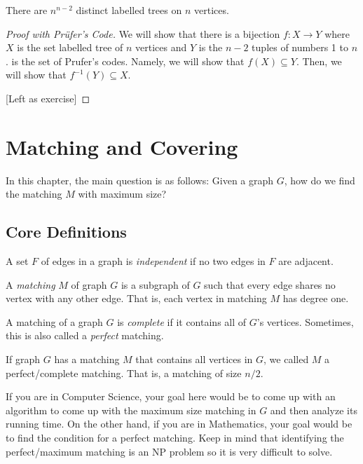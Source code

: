\begin{theorem}
  There are \(n^{n-2}\) distinct labelled trees on \(n\) vertices.
\end{theorem}

\begin{proof}[Proof with Pr\"{u}fer's Code]
  We will show that there is a bijection \(f : X \to Y\) where \(X\) is the set
  labelled tree of \(n\) vertices and \(Y\) is the \(n-2\) tuples of numbers 1 
  to \(n\). is the set of Prufer's codes. Namely, we will show that
  \(f(X) \subseteq Y\). Then, we will show that \(f^{-1}(Y) \subseteq X\).

  [Left as exercise]
\end{proof}

\chapter{Matching and Covering}

In this chapter, the main question is as follows: Given a graph \(G\), how do we
find the matching \(M\) with maximum size?

\section{Core Definitions}

\begin{definition}
  A set \(F\) of edges in a graph is \textit{independent} if no two edges in
  \(F\) are adjacent.
\end{definition}

\begin{definition}[Matching]
  A \textit{matching} \(M\) of graph \(G\) is a subgraph of \(G\) such that
  every edge shares no vertex with any other edge. That is, each vertex in
  matching \(M\) has degree one.
\end{definition}

\begin{definition}
  A matching of a graph \(G\) is \textit{complete} if it contains all of \(G\)'s
  vertices. Sometimes, this is also called a \textit{perfect} matching.
\end{definition}

\begin{remark}
  If graph \(G\) has a matching \(M\) that contains all vertices in \(G\), we
  called \(M\) a perfect/complete matching. That is, a matching of size \(n/2\).
\end{remark}

If you are in Computer Science, your goal here would be to come up with an
algorithm to come up with the maximum size matching in \(G\) and then analyze
its running time. On the other hand, if you are in Mathematics, your goal would
be to find the condition for a perfect matching. Keep in mind that identifying
the perfect/maximum matching is an NP problem so it is very difficult to solve. 
